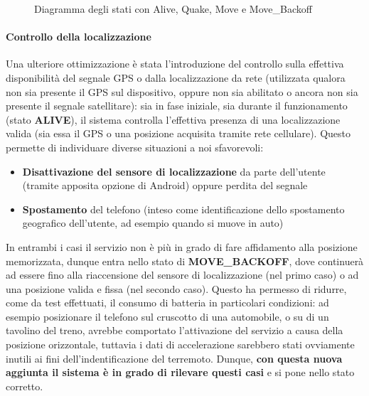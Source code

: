 \documentclass[a4paper,10pt]{memoir}
\begin{document}
\begin{figure}[ht]
\centering
\label{fig:scs_sm2}
\caption{Diagramma degli stati con Alive, Quake, Move e Move\_Backoff}
\end{figure}

\paragraph{Controllo della localizzazione} Una ulteriore ottimizzazione è stata l'introduzione del controllo sulla effettiva disponibilità del segnale GPS o dalla localizzazione da rete (utilizzata qualora non sia presente il GPS sul dispositivo, oppure non sia abilitato o ancora non sia presente il segnale satellitare): sia in fase iniziale, sia durante il funzionamento (stato \textbf{ALIVE}), il sistema controlla l'effettiva presenza di una localizzazione valida (sia essa il GPS o una posizione acquisita tramite rete cellulare). Questo permette di individuare diverse situazioni a noi sfavorevoli:

\begin{itemize}
\item \textbf{Disattivazione del sensore di localizzazione} da parte dell'utente (tramite apposita opzione di Android) oppure perdita del segnale
\item \textbf{Spostamento} del telefono (inteso come identificazione dello spostamento geografico dell'utente, ad esempio quando si muove in auto)
\end{itemize}

In entrambi i casi il servizio non è più in grado di fare affidamento alla posizione memorizzata, dunque entra nello stato di \textbf{MOVE\_BACKOFF}, dove continuerà ad essere fino alla riaccensione del sensore di localizzazione (nel primo caso) o ad una posizione valida e fissa (nel secondo caso). Questo ha permesso di ridurre, come da test effettuati, il consumo di batteria in particolari condizioni: ad esempio posizionare il telefono sul cruscotto di una automobile, o su di un tavolino del treno, avrebbe comportato l'attivazione del servizio a causa della posizione orizzontale, tuttavia i dati di accelerazione sarebbero stati ovviamente inutili ai fini dell'indentificazione del terremoto. Dunque, \textbf{con questa nuova aggiunta il sistema è in grado di rilevare questi casi} e si pone nello stato corretto.
\end{document}
